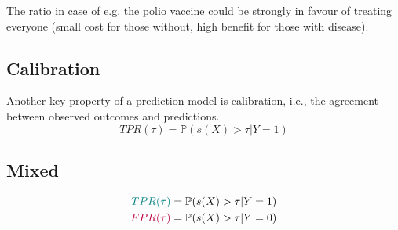 	The ratio in case of e.g. the polio vaccine could be strongly in favour of treating everyone (small cost for those without, high benefit for those with disease).
	
	
	
\subsection{Calibration}
	Another key property of a prediction model is calibration, i.e., the agreement between observed outcomes and predictions.
	\[
		TPR(\tau) = \mathbb{P}(s(X) > \tau | Y = 1)
	\]


\subsection{Mixed}
	\begin{align*}
    		\color{teal} TPR(\tau) &= \mathbb{P}(s(X) > \tau | Y = 1) \\
    		\color{purple} FPR(\tau) &= \mathbb{P}(s(X) > \tau | Y = 0) \\
    	\end{align*}

	
